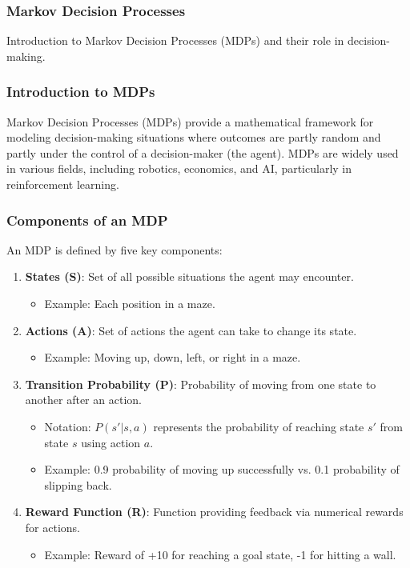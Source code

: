 \documentclass[aspectratio=169]{beamer}
\begin{document}
\begin{frame}[fragile]
  \frametitle{Markov Decision Processes}
  Introduction to Markov Decision Processes (MDPs) and their role in decision-making.
\end{frame}

\begin{frame}[fragile]
  \frametitle{Introduction to MDPs}
  Markov Decision Processes (MDPs) provide a mathematical framework for modeling decision-making situations where outcomes are partly random and partly under the control of a decision-maker (the agent). MDPs are widely used in various fields, including robotics, economics, and AI, particularly in reinforcement learning.
\end{frame}

\begin{frame}[fragile]
  \frametitle{Components of an MDP}
  An MDP is defined by five key components:
  \begin{enumerate}
      \item \textbf{States (S)}: Set of all possible situations the agent may encounter.
          \begin{itemize}
              \item Example: Each position in a maze.
          \end{itemize}

      \item \textbf{Actions (A)}: Set of actions the agent can take to change its state.
          \begin{itemize}
              \item Example: Moving up, down, left, or right in a maze.
          \end{itemize}
          
      \item \textbf{Transition Probability (P)}: Probability of moving from one state to another after an action.
          \begin{itemize}
              \item Notation: $P(s'|s,a)$ represents the probability of reaching state $s'$ from state $s$ using action $a$.
              \item Example: 0.9 probability of moving up successfully vs. 0.1 probability of slipping back.
          \end{itemize}

      \item \textbf{Reward Function (R)}: Function providing feedback via numerical rewards for actions.
          \begin{itemize}
              \item Example: Reward of +10 for reaching a goal state, -1 for hitting a wall.
          \end{itemize}


\end{enumerate}
\end{frame}
\end{document}
